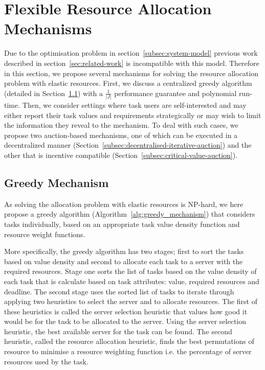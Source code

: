 \section{Flexible Resource Allocation Mechanisms}\label{sec:flexible-resource-allocation-mechanisms}
Due to the optimisation problem in section~\ref{subsec:system-model} previous work described in
section~\ref{sec:related-work} is incompatible with this model. Therefore in this section, we propose several
mechanisms for solving the resource allocation problem with elastic resources. First, we discuss a centralized greedy
algorithm (detailed in Section~\ref{subsec:greedy-mechanism}) with a $\frac{1}{\left|J\right|}$ performance guarantee
and polynomial run-time. Then, we consider settings where task users are self-interested and may either report their
task values and requirements strategically or may wish to limit the information they reveal to the mechanism. To deal
with such cases, we propose two auction-based mechanisms, one of which can be executed in a decentralized manner
(Section~\ref{subsec:decentralised-iterative-auction}) and the other that is incentive compatible
(Section~\ref{subsec:critical-value-auction}).

\subsection{Greedy Mechanism}\label{subsec:greedy-mechanism}
As solving the allocation problem with elastic resources is NP-hard, we here propose a greedy algorithm
(Algorithm~\ref{alg:greedy_mechanism}) that considers tasks individually, based on an appropriate task value density
function and resource weight functions.

More specifically, the greedy algorithm has two stages; first to sort the tasks based on value density and second to
allocate each task to a server with the required resources. Stage one sorts the list of tasks based on the value
density of each task that is calculate based on task attributes: value, required resources and deadline. The second
stage uses the sorted list of tasks to iterate through applying two heuristics to select the server and to allocate
resources. The first of these heuristics is called the server selection heuristic that values how good it would be
for the task to be allocated to the server. Using the server selection heuristic, the best available server for the
task can be found. The second heuristic, called the resource allocation heuristic, finds the best permutations of
resource to minimise a resource weighting function i.e. the percentage of server resources used by the task.

